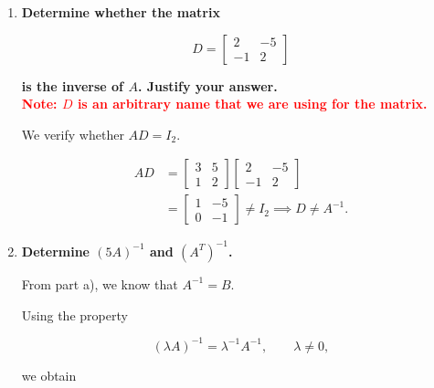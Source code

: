 \begin{enumerate}[label=\alph*)]
\begin{answer}
        Therefore,

        $$
        \boxed{A^{-1}=B}.
        $$
    \end{answer}


    \item \textbf{Determine whether the matrix}

    $$
    D=
    \begin{bmatrix}
        2 & -5 \\
        -1 & 2
    \end{bmatrix}
    $$ 

    \textbf{is the inverse of $A$. Justify your answer.} \\
    
    \textbf{\textcolor{red}{Note: $D$ is an arbitrary name that we are using for the matrix.}}

    \begin{answer}
        We verify whether $AD=I_2$.

        $$
        \begin{aligned}
        AD
        &=
        \begin{bmatrix}
            3 & 5 \\
            1 & 2
        \end{bmatrix}
        \begin{bmatrix}
            2 & -5 \\
            -1 & 2
        \end{bmatrix}\\
        &=
        \begin{bmatrix}
            1 & -5 \\
            0 & -1
        \end{bmatrix}
        \neq I_2 \implies \boxed{D \neq A^{-1}}.
        \end{aligned}
        $$
    \end{answer}


    \item \textbf{Determine $(5A)^{-1}$ and $(A^T)^{-1}$.}

    \begin{answer}
        From part a), we know that $A^{-1}=B$.

        Using the property

        $$
        (\lambda A)^{-1}=\lambda^{-1}A^{-1},
        \qquad \lambda\neq0,
        $$

        we obtain


\end{answer}
\end{enumerate}
